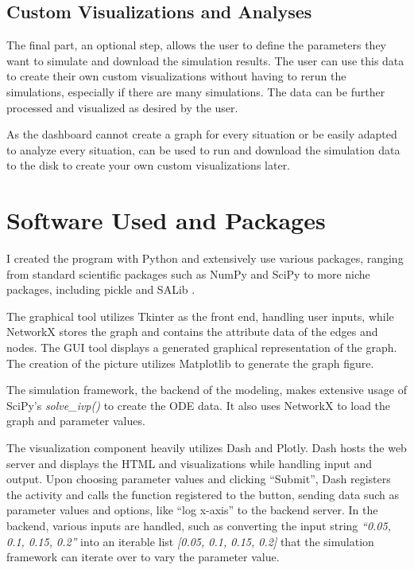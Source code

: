 \subsection{Custom Visualizations and Analyses} 
\label{sec:custom_visualizations_and_framework}
The final part, an optional step, allows the user to define the parameters they want to simulate and download the simulation results. 
The user can use this data to create their own custom visualizations without having to rerun the simulations, especially if there are many simulations. 
The data can be further processed and visualized as desired by the user. 

As the dashboard cannot create a graph for every situation or be easily adapted to analyze every situation,  can be used to run and download the simulation data to the disk to create your own custom visualizations later. 

\section{Software Used and Packages}
I created the program with Python \cite{Python} and extensively use various packages, ranging from standard scientific packages such as NumPy \cite{NumPy} and SciPy to more niche packages, including pickle and SALib \cite{iwanagaSALib20Advancing2022, hermanSALibOpensourcePython2017}.

The graphical tool utilizes Tkinter as the front end, handling user inputs, while NetworkX \cite{hagbergExploringNetworkStructure2008} stores the graph and contains the attribute data of the edges and nodes. 
The GUI tool displays a generated graphical representation of the graph. 
The creation of the picture utilizes Matplotlib \cite{Matplotlib} to generate the graph figure. 

The simulation framework, the backend of the modeling, makes extensive usage of SciPy's \textit{solve\_ivp()} to create the ODE data. 
It also uses NetworkX to load the graph and parameter values. 

The visualization component heavily utilizes Dash and Plotly. 
Dash hosts the web server and displays the HTML and visualizations while handling input and output. 
Upon choosing parameter values and clicking “Submit”, Dash registers the activity and calls the function registered to the button, sending data such as parameter values and options, like “log x-axis” to the backend server. 
In the backend, various inputs are handled, such as converting the input string \textit{“0.05, 0.1, 0.15, 0.2”} into an iterable list \textit{[0.05, 0.1, 0.15, 0.2]} that the simulation framework can iterate over to vary the parameter value. 

